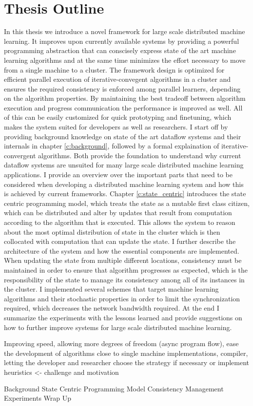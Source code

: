 \section{Thesis Outline}
In this thesis we introduce a novel framework for large scale distributed machine learning.
It improves upon currently available systems by providing a powerful programming abstraction that can conscisely express state of the art machine learning algorithms and at the same time minimizes the effort necessary to move from a single machine to a cluster.
The framework design is optimized for efficient parallel execution of iterative-convegent algorithms in a cluster and ensures the required consistency is enforced among parallel learners, depending on the algorithm properties. By maintaining the best tradeoff between algorithm execution and progress communication the performance is improved as well.
All of this can be easily customized for quick prototyping and finetuning, which makes the system suited for developers as well as researchers.
I start off by providing background knowledge on state of the art dataflow systems and their internals in chapter \ref{c:background}, followed by a formal explaination of iterative-convergent algorithms. Both provide the foundation to understand why current dataflow systems are unsuited for many large scale distributed machine learning applications.
I provide an overview over the important parts that need to be considered when developing a distributed machine learning system and how this is achieved by current frameworks.
Chapter \ref{c:state_centric} introduces the state centric programming model, which treats the state as a mutable first class citizen, which can be distributed and alter by updates that result from computation according to the algorithm that is executed.
This allows the system to reason about the most optimal distribution of state in the cluster which is then collocated with computation that can update the state. I further describe the architecture of the system and how the essential components are implemented.
When updating the state from multiple different locations, consistency must be maintained in order to ensure that algorithm progresses as expected, which is the responsibility of the state to manage its consistency among all of its instances in the cluster. I implemented several schemes that target machine learning algorithms and their stochastic properties in order to limit the synchronization required, which decreases the network bandwidth required.
At the end I summarize the experiments with the lessons learned and provide suggestions on how to further improve systems for large scale distributed machine learning.

Improving speed, allowing more degrees of freedom (async program flow), ease the development of algorithms close to single machine implementations, compiler, letting the developer and researcher choose the strategy if necessary or implement heuristics <- challenge and motivation

Background
State Centric Programming Model
Consistency Management
Experiments
Wrap Up
